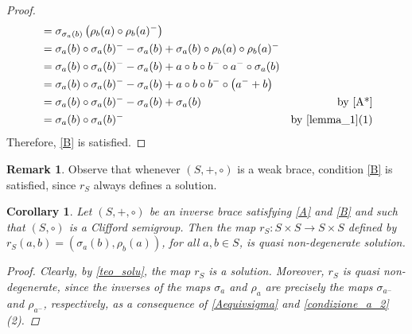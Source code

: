 \documentclass[preprint,1p]{elsarticle}
\newtheorem{cor}[theor]{Corollary}
\theoremstyle{definition}               %
\newtheorem{rem}[theor]{Remark}
\begin{document}
\begin{proof}
\begin{align*}
&=\sigma_{\sigma_a\left(b\right)}\left(\rho_b(a) \circ \rho_b(a)^-\right)\\
  &=\sigma_a(b) \circ \sigma_a(b)^--\sigma_a(b)+ \sigma_a(b) \circ \rho_b(a) \circ \rho_b(a)^-\\
    &=\sigma_a(b) \circ \sigma_a(b)^--\sigma_a(b)+ a \circ b \circ b^- \circ a^- \circ \sigma_a(b)\\
   &=\sigma_a(b) \circ \sigma_a(b)^--\sigma_a(b)+a \circ b \circ b^- \circ \left(a^-+b\right)\\
   &= \sigma_a(b) \circ \sigma_a(b)^--\sigma_a(b)+\sigma_a(b) &\mbox{by \cref{A*}}\\
   &=\sigma_a(b) \circ \sigma_a(b)^- &\mbox{by \cref{lemma_1}(1)}
  \end{align*}
Therefore, \eqref{B} is satisfied.
\end{proof}




\smallskip

\begin{rem}
 Observe that whenever $(S,+, \circ)$ is a weak brace, condition \eqref{B} is satisfied, since $r_S$ always defines a solution.
\end{rem}




\smallskip




\begin{cor}\label{cor_quasi_non_deg}
    Let $(S, +, \circ)$ be an inverse brace satisfying \eqref{A} and \eqref{B} and such that $(S, \circ)$ is a Clifford semigroup. Then the map $r_S:S \times S\to S\times S$ defined by $r_S(a,b)=\left(\sigma_a(b), \rho_b(a)\right)$,
 for all $a, b \in S$, is quasi non-degenerate solution.
    \begin{proof}
       Clearly, by \cref{teo_solu}, the map $r_S$ is a solution. Moreover, $r_S$ is quasi non-degenerate, since the inverses of the maps $\sigma_a$ and $\rho_a$ are precisely the maps $\sigma_{a^-}$ and $\rho_{a^-}$, respectively, as a consequence of
       \cref{Aequivsigma} and \cref{condizione_a_2}(2).
    \end{proof}
\end{cor}


\smallskip
\end{document}
